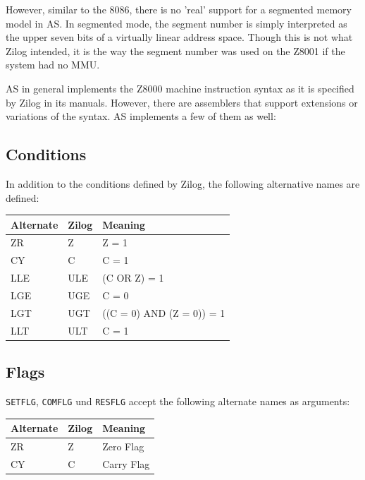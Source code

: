 \documentclass[12pt,twoside]{report}
\newcommand{\tty}[1]{{\tt #1}}
\newcommand{\asname}{{AS}}
\begin{document}
However, similar to the 8086, there is no 'real' support for a segmented
memory model in \asname{}. In segmented mode, the segment number is simply interpreted
as the upper seven bits of a virtually linear address space.  Though this is
not what Zilog intended, it is the way the segment number was used on the
Z8001 if the system had no MMU.

\asname{} in general implements the Z8000 machine instruction syntax as it is specified
by Zilog in its manuals.  However, there are assemblers that support extensions
or variations of the syntax.  \asname{} implements a few of them as well:

\subsection{Conditions}

In addition to the conditions defined by Zilog, the following alternative names
are defined:

\begin{center}\begin{tabular}{|l|l|l|}
\hline
Alternate & Zilog & Meaning \\
\hline
\hline
ZR         & Z     & Z = 1 \\
CY         & C     & C = 1 \\
LLE        & ULE   & (C OR Z) = 1 \\
LGE        & UGE   & C = 0 \\
LGT        & UGT   & ((C = 0) AND (Z = 0)) = 1 \\
LLT        & ULT   & C = 1 \\
\hline
\end{tabular}\end{center}

\subsection{Flags}

\tty{SETFLG}, \tty{COMFLG} und \tty{RESFLG} accept the following alternate names
as arguments:

\begin{center}\begin{tabular}{|l|l|l|}
\hline
Alternate & Zilog & Meaning \\
\hline
\hline
ZR         & Z     & Zero Flag \\
CY         & C     & Carry Flag \\
\hline
\end{tabular}\end{center}
\end{document}
